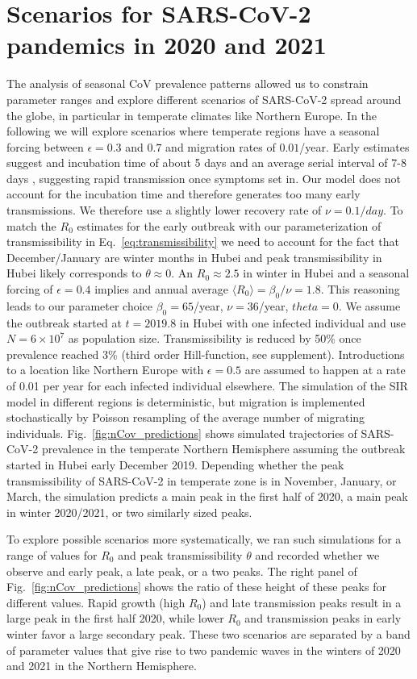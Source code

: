 \documentclass[rmp, reprint, superscriptaddress, floatfix,amsmath]{revtex4-1}
\begin{document}
\section{Scenarios for SARS-CoV-2 pandemics in 2020 and 2021}
The analysis of seasonal CoV prevalence patterns allowed us to constrain parameter ranges and explore different scenarios of SARS-CoV-2 spread around the globe, in particular in temperate climates like Northern Europe. 
In the following we will explore scenarios where temperate regions have a seasonal forcing between $\epsilon=0.3$ and $0.7$ and migration rates of $0.01$/year. 
Early estimates suggest and incubation time of about 5 days \citep{backer_incubation_2020} and an average serial interval of 7-8 days \citep{wu_nowcasting_2020}, suggesting rapid transmission once symptoms set in. 
Our model does not account for the incubation time and therefore generates too many early transmissions. 
We therefore use a slightly lower recovery rate of $\nu = 0.1/day$. 
To match the $R_0$ estimates for the early outbreak with our parameterization of transmissibility in Eq.~\ref{eq:transmissibility} we need to account for the fact that December/January are winter months in Hubei and peak transmissibility in Hubei likely corresponds to $\theta\approx 0$. An $R_0\approx 2.5$ in winter in Hubei and a seasonal forcing of $\epsilon=0.4$ implies and annual average $\langle R_0\rangle = \beta_0/\nu=1.8$.
This reasoning leads to our parameter choice $\beta_0=65$/year, $\nu=36$/year, $theta=0$. 
We assume the outbreak started at $t=2019.8$ in Hubei with one infected individual and use $N=6\times 10^{7}$ as population size.
Transmissibility is reduced by 50\% once prevalence reached 3\% (third order Hill-function, see supplement).
Introductions to a location like Northern Europe with $\epsilon=0.5$ are assumed to happen at a rate of 0.01 per year for each infected individual elsewhere.
The simulation of the SIR model in different regions is deterministic, but migration is implemented stochastically by Poisson resampling of the average number of migrating individuals. 
Fig.~\ref{fig:nCov_predictions} shows simulated trajectories of SARS-CoV-2 prevalence in the temperate Northern Hemisphere assuming the outbreak started in Hubei early December 2019.
Depending whether the peak transmissibility of SARS-CoV-2 in temperate zone is in November, January, or March, the simulation predicts a main peak in the first half of 2020, a main peak in winter 2020/2021, or two similarly sized peaks.

To explore possible scenarios more systematically, we ran such simulations for a range of values for $R_0$ and peak transmissibility $\theta$ and recorded whether we observe and early peak, a late peak, or a two peaks. 
The right panel of Fig.~\ref{fig:nCov_predictions} shows the ratio of these height of these peaks for different values.
Rapid growth (high $R_0$) and late transmission peaks result in a large peak in the first half 2020, while lower $R_0$ and transmission peaks in early winter favor a large secondary peak. 
These two scenarios are separated by a band of parameter values that give rise to two pandemic waves in the winters of 2020 and 2021 in the Northern Hemisphere.
\end{document}
